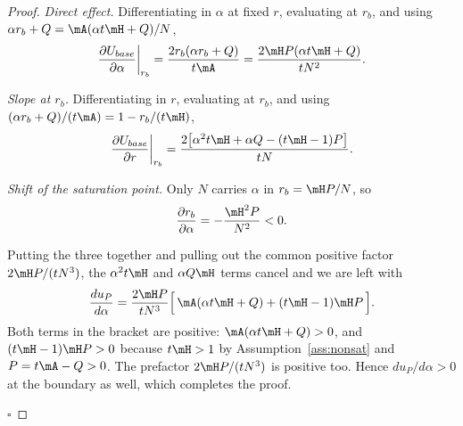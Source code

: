 \begin{proof}
\emph{Direct effect.} Differentiating in $\alpha$ at fixed $r$, evaluating at
$r_b$, and using $\alpha r_b + Q = \mA(\alpha t\mH + Q)/N$,
\[
\frac{\partial U_{base}}{\partial\alpha}\bigg|_{r_b}
= \frac{2r_b(\alpha r_b + Q)}{t\mA}
= \frac{2\mH P(\alpha t\mH + Q)}{tN^2}.
\]

\emph{Slope at $r_b$.} Differentiating in $r$, evaluating at $r_b$, and using
$(\alpha r_b + Q)/(t\mA) = 1 - r_b/(t\mH)$,
\[
\frac{\partial U_{base}}{\partial r}\bigg|_{r_b}
= \frac{2\bigl[\alpha^2 t\mH + \alpha Q - (t\mH - 1)P\bigr]}{tN}.
\]

\emph{Shift of the saturation point.} Only $N$ carries $\alpha$ in
$r_b = \mH P/N$, so
\[
\frac{\partial r_b}{\partial\alpha} = -\frac{\mH^2 P}{N^2} < 0.
\]

Putting the three together and pulling out the common positive factor
$2\mH P/(tN^3)$, the $\alpha^2 t\mH$ and $\alpha Q\mH$ terms cancel and we are
left with
\[
\frac{du_P}{d\alpha}
= \frac{2\mH P}{tN^3}\Bigl[\,\mA(\alpha t\mH + Q) + (t\mH - 1)\mH P\,\Bigr].
\]
Both terms in the bracket are positive: $\mA(\alpha t\mH + Q) > 0$, and
$(t\mH - 1)\mH P > 0$ because $t\mH > 1$ by Assumption~\ref{ass:nonsat} and
$P = t\mA - Q > 0$. The prefactor $2\mH P/(tN^3)$ is positive too. Hence
$du_P/d\alpha > 0$ at the boundary as well, which completes the proof.

\hfill $\square$
\end{proof}


